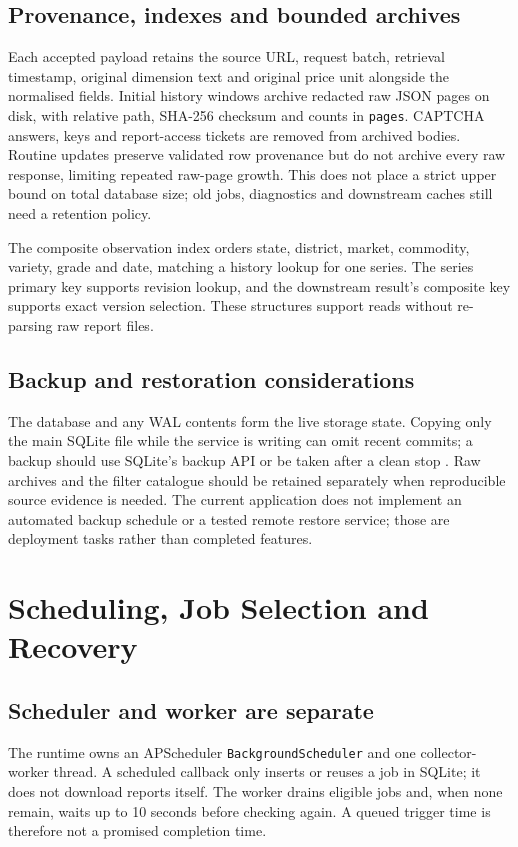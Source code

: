 \documentclass[12pt,a4paper,oneside]{report}
\numberwithin{equation}{chapter}
\numberwithin{figure}{chapter}
\numberwithin{table}{chapter}
\theoremstyle{definition}
\begin{document}
\section{Provenance, indexes and bounded archives}
Each accepted payload retains the source URL, request batch, retrieval timestamp, original dimension text and original price unit alongside the normalised fields. Initial history windows archive redacted raw JSON pages on disk, with relative path, SHA-256 checksum and counts in \texttt{pages}. CAPTCHA answers, keys and report-access tickets are removed from archived bodies. Routine updates preserve validated row provenance but do not archive every raw response, limiting repeated raw-page growth. This does not place a strict upper bound on total database size; old jobs, diagnostics and downstream caches still need a retention policy.

The composite observation index orders state, district, market, commodity, variety, grade and date, matching a history lookup for one series. The series primary key supports revision lookup, and the downstream result's composite key supports exact version selection. These structures support reads without re-parsing raw report files.

\section{Backup and restoration considerations}
The database and any WAL contents form the live storage state. Copying only the main SQLite file while the service is writing can omit recent commits; a backup should use SQLite's backup API or be taken after a clean stop \cite{sqlitebackup}. Raw archives and the filter catalogue should be retained separately when reproducible source evidence is needed. The current application does not implement an automated backup schedule or a tested remote restore service; those are deployment tasks rather than completed features.

\chapter{Scheduling, Job Selection and Recovery}

\section{Scheduler and worker are separate}
\label{sec:jobs}
The runtime owns an APScheduler \texttt{BackgroundScheduler} and one collector-worker thread. A scheduled callback only inserts or reuses a job in SQLite; it does not download reports itself. The worker drains eligible jobs and, when none remain, waits up to 10 seconds before checking again. A queued trigger time is therefore not a promised completion time.
\end{document}
